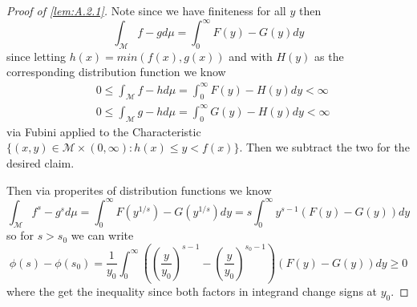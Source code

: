 \documentclass[10pt]{article}
\newcommand{\1}{\textbf{1}}
\theoremstyle{remark}
\theoremstyle{definition}
\begin{document}
\begin{proof}[Proof of \ref{lem:A.2.1}]
	Note since we have finiteness for all $y$ then
	\begin{equation*}
		\int_{\mathcal{M}} f-gd\mu = \int_0^{\infty}F(y)-G(y)dy
	\end{equation*} since letting $h(x) = min(f(x),g(x))$ and with $H(y)$ as the corresponding distribution function we know
	\begin{align*}
		&0 \leq \int_{\mathcal{M}}f-hd\mu = \int_0^{\infty}F(y)-H(y)dy < \infty\\
		&0 \leq \int_{\mathcal{M}} g-hd\mu = \int_0^{\infty} G(y)-H(y)dy < \infty
	\end{align*} via Fubini applied to the Characteristic $\{(x,y) \in \mathcal{M} \times (0,\infty) : h(x) \leq y < f(x)\}$. Then we subtract the two for the desired claim.

	Then via properites of distribution functions we know
	\begin{equation*}
		\int_{\mathcal{M}}f^s -g^sd\mu = \int_0^{\infty}F(y^{1/s})-G(y^{1/s}) dy = s\int_0^{\infty}y^{s-1}(F(y)-G(y))dy
	\end{equation*} so for $s > s_0$ we can write
	\begin{equation*}
		\phi(s) - \phi(s_0) = \frac{1}{y_0} \int_0^{\infty}((\frac{y}{y_0})^{s-1}-(\frac{y}{y_0})^{s_0-1})(F(y)-G(y))dy \geq 0
	\end{equation*} where the get the inequality since both factors in integrand change signs at $y_0$.
\end{proof}

\newpage
\end{document}
